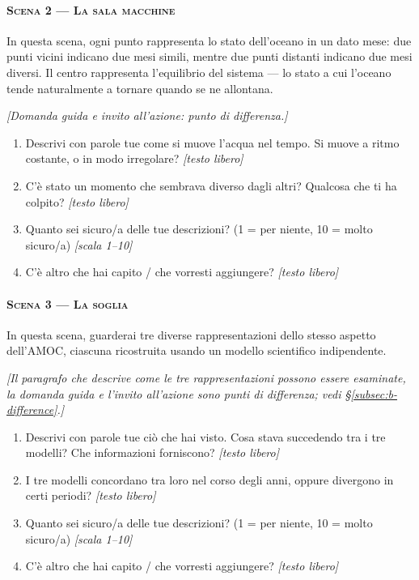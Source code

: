 \paragraph{\textsc{Scena 2 --- La sala macchine}}
In questa scena, ogni punto rappresenta lo stato dell'oceano in un dato mese: due punti vicini
indicano due mesi simili, mentre due punti distanti indicano due mesi diversi. Il centro rappresenta
l'equilibrio del sistema --- lo stato a cui l'oceano tende naturalmente a tornare quando se ne
allontana.

\emph{[Domanda guida e invito all'azione: punto di differenza.]}

\begin{enumerate}[leftmargin=2.4em, itemsep=3pt, start=11]
\item Descrivi con parole tue come si muove l'acqua nel tempo. Si muove a ritmo costante, o in modo
      irregolare? \emph{[testo libero]}
\item C'è stato un momento che sembrava diverso dagli altri? Qualcosa che ti ha colpito?
      \emph{[testo libero]}
\item Quanto sei sicuro/a delle tue descrizioni? (1 = per niente, 10 = molto sicuro/a)
      \emph{[scala 1--10]}
\item C'è altro che hai capito / che vorresti aggiungere? \emph{[testo libero]}
\end{enumerate}

\paragraph{\textsc{Scena 3 --- La soglia}}
In questa scena, guarderai tre diverse rappresentazioni dello stesso aspetto dell'AMOC, ciascuna
ricostruita usando un modello scientifico indipendente.

\emph{[Il paragrafo che descrive come le tre rappresentazioni possono essere esaminate, la domanda
guida e l'invito all'azione sono punti di differenza; vedi \S\ref{subsec:b-difference}.]}

\begin{enumerate}[leftmargin=2.4em, itemsep=3pt, start=15]
\item Descrivi con parole tue ciò che hai visto. Cosa stava succedendo tra i tre modelli? Che
      informazioni forniscono? \emph{[testo libero]}
\item I tre modelli concordano tra loro nel corso degli anni, oppure divergono in certi periodi?
      \emph{[testo libero]}
\item Quanto sei sicuro/a delle tue descrizioni? (1 = per niente, 10 = molto sicuro/a)
      \emph{[scala 1--10]}
\item C'è altro che hai capito / che vorresti aggiungere? \emph{[testo libero]}
\end{enumerate}

